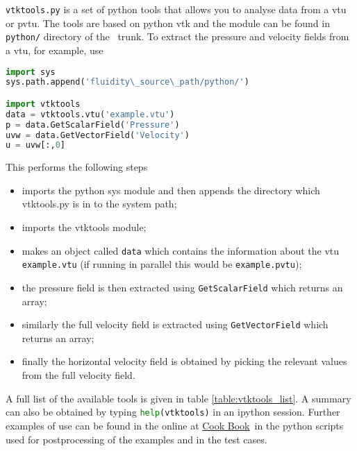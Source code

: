 \lstinline[language = bash]+vtktools.py+ is a set of python tools that allows you to analyse data from a vtu or pvtu. The tools are based on python vtk and the module can be found in \lstinline[language = bash]+python/+ directory of the \fluidity\ trunk. To extract the pressure and velocity fields from a vtu, for example, use
\begin{lstlisting}[language = Python]
import sys
sys.path.append('fluidity\_source\_path/python/') 

import vtktools
data = vtktools.vtu('example.vtu')
p = data.GetScalarField('Pressure')
uvw = data.GetVectorField('Velocity')
u = uvw[:,0]
\end{lstlisting}  
This performs the following steps
\begin{itemize}
\item imports the python sys module and then appends the directory which vtktools.py is in to the system path;
\item imports the vtktools module;
\item makes an object called \lstinline[language=Python]+data+ which contains the information about the vtu \lstinline[language=Python]+example.vtu+ (if running in parallel this would be \lstinline[language=Python]+example.pvtu+);
\item the pressure field is then extracted using \lstinline[language=Python]+GetScalarField+ which returns an array;
\item similarly the full velocity field is extracted using \lstinline[language=Python]+GetVectorField+ which returns an array;
\item finally the horizontal velocity field is obtained by picking the relevant values from the full velocity field.
\end{itemize}
A full list of the available tools is given in table \ref{table:vtktools_list}. A summary can also be obtained by typing \lstinline[language=Python]+help(vtktools)+ in an ipython session.  Further examples of use can be found in the online at \href{http://amcg.ese.ic.ac.uk/index.php?title=Cook_Book}{Cook Book}\, in the python scripts used for postprocessing of the examples and in the test cases.
 

